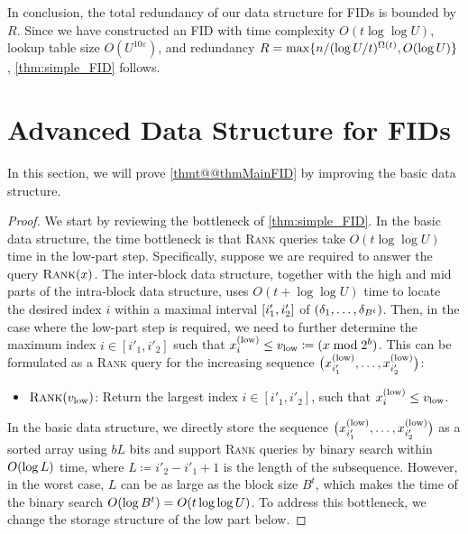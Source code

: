 \documentclass{article}
\theoremstyle{plain}
\theoremstyle{definition}  \newtheorem{definition}[theorem]{Definition}
\DeclarePairedDelimiter{\bk}{(}{)}
\DeclarePairedDelimiter{\Bk}{[}{]}
\DeclarePairedDelimiter{\BK}{\{}{\}}
\newcommand{\defeq}{\coloneqq}
\newcommand{\eps}{\varepsilon}
\newcommand{\xlow}[1][i]{x_{#1}^{(\textup{low})}}
\newcommand{\rank}{\textup{\textsc{Rank}}\xspace}
\newcommand{\vlow}{v_{\textup{low}}}
\begin{document}
\smallskip

In conclusion, the total redundancy of our data structure for FIDs is bounded by $R$. Since we have constructed an FID with time complexity $O(t\log \log U)$, lookup table size $O(U^{10 \eps})$, and redundancy $R = \max \BK{n/(\log U/t)^{\Omega(t)}, O(\log U)}$, \cref{thm:simple_FID} follows.
 
\section{Advanced Data Structure for FIDs}
\label{sec:advanced}

In this section, we will prove \cref{thmt@@thmMainFID} by improving the basic data structure. 
\thmMainFID*

\begin{proof}
  We start by reviewing the bottleneck of \cref{thm:simple_FID}.
  In the basic data structure, the time bottleneck is that \rank queries take $O(t \log \log U)$ time in the low-part step. Specifically, suppose we are required to answer the query $\rank(x)$. The inter-block data structure, together with the high and mid parts of the intra-block data structure, uses $O(t + \log \log U)$ time to locate the desired index $i$ within a maximal interval $\Bk{i'_1, i'_2}$ of $\bk{\delta_1, \ldots, \delta_{B^t}}$.
Then, in the case where the low-part step is required, we need to further determine the maximum index $i \in [i'_1, i'_2]$ such that $\xlow \le \vlow \defeq (x \bmod 2^b)$. This can be formulated as a \rank query for the increasing sequence $\bk[\big]{\xlow[i'_1], \ldots, \xlow[i'_2]}$:
\begin{itemize}
\item $\rank(\vlow)$: Return the largest index $i \in [i'_1, i'_2]$, such that $\xlow \le \vlow$.
\end{itemize}
In the basic data structure, we directly store the sequence $\bk[\big]{\xlow[i'_1], \ldots, \xlow[i'_2]}$ as a sorted array using $bL$ bits and support \rank queries by binary search within $O\bk{\log L}$ time, where $L \defeq i'_2 - i'_1 + 1$ is the length of the subsequence. However, in the worst case, $L$ can be as large as the block size $B^t$, which makes the time of the binary search $O\bk{\log B^t} = O(t \log \log U)$. To address this bottleneck, we change the storage structure of the low part below.


\end{proof}
\end{document}
